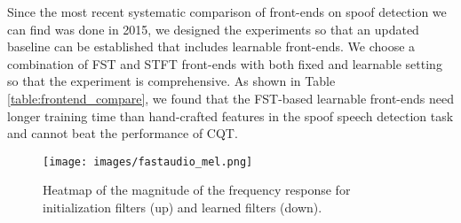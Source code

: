 \documentclass[conference]{IEEEtran}
\begin{document}
Since the most recent systematic comparison of front-ends on spoof detection we can find was done in 2015\cite{Xiao2015SpoofingSD}, we designed the experiments so that an updated baseline can be established that includes learnable front-ends. We choose a combination of FST and STFT front-ends with both fixed and learnable setting so that the experiment is comprehensive. As shown in Table \ref{table:frontend_compare}, we found that the FST-based learnable front-ends need longer training time than hand-crafted features in the spoof speech detection task and cannot beat the performance of CQT.

\begin{figure}[hbtp]
\centering
\texttt{[image: images/fastaudio\_mel.png]}
\caption{Heatmap of the magnitude of the frequency response for initialization filters (up) and learned filters (down).}
\label{fig:fastaudio-mel}
\end{figure}
\end{document}
